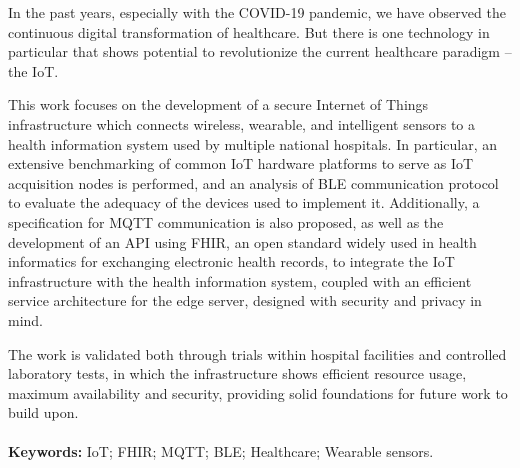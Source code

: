 
\vspace{1cm}
\noindent

In the past years, especially with the COVID-19 pandemic, we have observed the continuous digital transformation of healthcare. But there is one technology in particular that shows potential to revolutionize the current healthcare paradigm -- the \acf{IoT}. 

This work focuses on the development of a secure Internet of Things infrastructure which connects wireless, wearable, and intelligent sensors to a health information system used by multiple national hospitals. In particular, an extensive benchmarking of common IoT hardware platforms to serve as \acs{IoT} acquisition nodes is performed, and an analysis of \acf{BLE} communication protocol to evaluate the adequacy of the devices used to implement it. Additionally, a specification for \acf{MQTT} communication is also proposed, as well as the development of an \acf{API} using \acf{FHIR}, an open standard widely used in health informatics for exchanging electronic health records, to integrate the IoT infrastructure with the health information system, coupled with an efficient service architecture for the edge server, designed with security and privacy in mind. 

The work is validated both through trials within hospital facilities and controlled laboratory tests, in which the infrastructure shows efficient resource usage, maximum availability and security, providing solid foundations for future work to build upon.

\paragraph{}\textbf{Keywords:} \acl{IoT}; \acs{FHIR}; \acs{MQTT}; \acl{BLE}; Healthcare; Wearable sensors.
